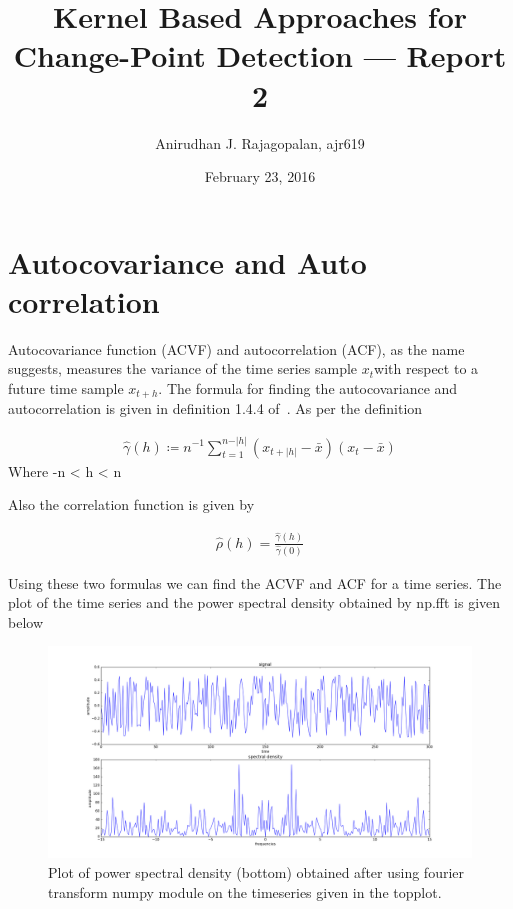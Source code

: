 \documentclass{article}
\begin{document}
\title{Kernel Based Approaches for Change-Point Detection --- Report 2}
\date{February 23, 2016}
\author{Anirudhan J. Rajagopalan, ajr619}

\maketitle

\newpage
\section{Autocovariance and Auto correlation}
Autocovariance function (ACVF) and autocorrelation (ACF), as the name suggests, measures the variance of the time series sample $x_{t} $with respect to a future time sample $ x_{t+h} $.  The formula for finding the autocovariance and autocorrelation is given in definition 1.4.4 of~\cite{itsf}.
As per the definition 

\begin{align}
  \label{eq_acvf}
  \hat{\gamma}(h) \coloneqq n^{-1} \sum_{t = 1}^{n - \vert h \vert} (x_{t+|h|} - \bar{x}) (x_{t} - \bar{x})
\end{align}
Where -n < h < n

Also the correlation function is given by 

\begin{align}
  \label{eq_acf}
  \hat{\rho}(h) = \frac{\hat{\gamma}(h)}{\hat{\gamma}(0)}
\end{align}

Using these two formulas we can find the ACVF and ACF for a time series.  The plot of the time series and the power spectral density obtained by np.fft is given below

\begin{figure}[ht!]
  \centering
  \includegraphics[width=1\textwidth]{images/spectral_density/psd}
  \caption{Plot of power spectral density (bottom) obtained after using fourier transform numpy module on the timeseries given in the topplot.\label{fig:sd_psd}}
\end{figure}
\end{document}
